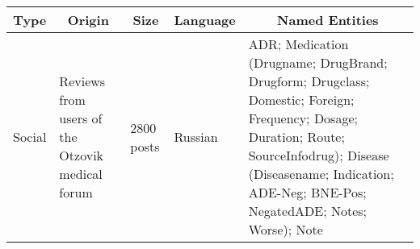\begin{tabular}{|p{}|p{}|p{}|p{}|p{}|}
\hline
\multicolumn{1}{|c|}{Type} & \multicolumn{1}{c|}{Origin}            & \multicolumn{1}{c|}{Size} & \multicolumn{1}{c|}{Language} & \multicolumn{1}{c|}{Named Entities}                                          

\\ \hline
Social                              & Reviews from users of the Otzovik medical forum & 2800 posts                         & Russian                                & ADR; Medication (Drugname; DrugBrand; Drugform; Drugclass; Domestic; Foreign; Frequency; Dosage; Duration; Route; SourceInfodrug); Disease (Diseasename; Indication; ADE-Neg; BNE-Pos; NegatedADE; Notes; Worse); Note \\ \hline
\end{tabular}